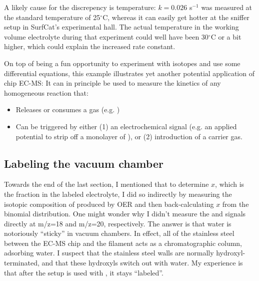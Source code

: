 A likely cause for the discrepency is temperature: $k=0.026$ s$^{-1}$ was measured at the standard temperature of 25$^\circ$C, whereas it can easily get hotter at the sniffer setup in SurfCat's experimental hall. The actual temperature in the working volume electrolyte during that experiment could well have been 30$^\circ$C or a bit higher, which could explain the increased rate constant.

On top of being a fun opportunity to experiment with isotopes and use some differential equations, this example illustrates yet another potential application of chip EC-MS: It can in principle be used to measure the kinetics of any homogeneous reaction that:
\begin{itemize}
	\item Releases or consumes a gas (e.g. )
	\item Can be triggered by either (1) an electrochemical signal (e.g. an applied potential to strip off a monolayer of ), or (2) introduction of a carrier gas.
\end{itemize}


\subsection{Labeling the vacuum chamber}\label{subsec:vacuum_transport}

Towards the end of the last section, I mentioned that to determine $x$, which is the fraction  in the labeled electrolyte, I did so indirectly by measuring the isotopic composition of  produced by OER and then back-calculating $x$ from the binomial distribution. One might wonder why I didn't measure the  and  signals directly at m/z=18 and m/z=20, respectively. The answer is that water is notoriously ``sticky'' in vacuum chambers\cite{PfeifferKnowhow}. In effect, all of the stainless steel between the EC-MS chip and the filament acts as a chromatographic column, adsorbing water. I suspect that the stainless steel walls are normally hydroxyl-terminated, and that these hydroxyls switch out with water. My experience is that after the setup is used with , it stays ``labeled''.

